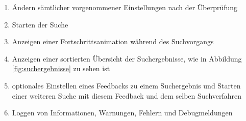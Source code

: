 \begin{enumerate} [label=\bfseries /F \arabic*0/, leftmargin=*]
	\item Ändern sämtlicher vorgenommener Einstellungen nach der Überprüfung \label{f:einstellungen_nach_ueberpruefung_aendern}
	\newline
	\item Starten der Suche \label{f:suche_starten}
	\item Anzeigen einer Fortschrittsanimation während des Suchvorgangs \label{f:fortschrittsanimation}
	\newline
	\item Anzeigen einer sortierten \"Ubersicht der Suchergebnisse, wie in Abbildung \ref{fig:suchergebnisse} zu sehen ist \label{f:suchergebnisse_anzeigen}
	\item optionales Einstellen eines Feedbacks zu einem Suchergebnis und Starten einer weiteren Suche mit diesem Feedback und dem selben Suchverfahren \label{f:feedback}
	
	\item Loggen von Informationen, Warnungen, Fehlern und Debugmeldungen
	 
\end{enumerate}


